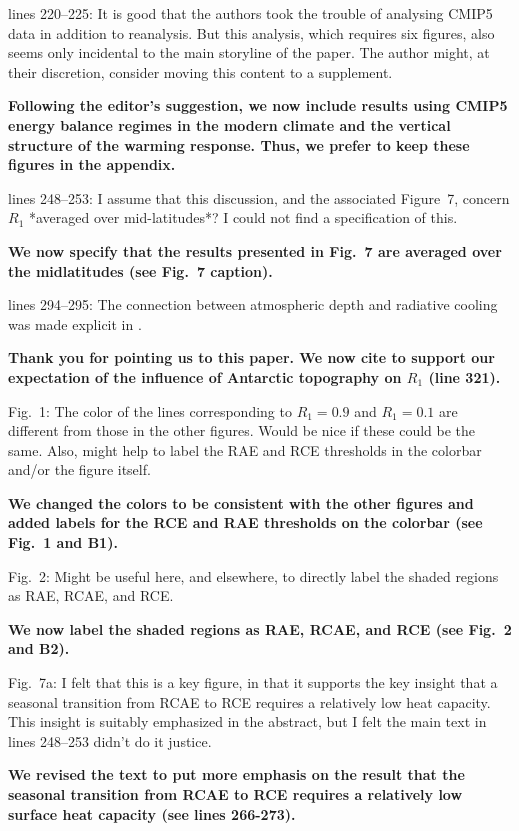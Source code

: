 \documentclass{article}
\begin{document}
lines 220--225: It is good that the authors took the trouble of analysing CMIP5 data in addition to reanalysis. But this analysis, which requires six figures, also seems only incidental to the main storyline of the paper. The author might, at their discretion, consider moving this content to a supplement.

\textbf{Following the editor's suggestion, we now include results using CMIP5 energy balance regimes in the modern climate and the vertical structure of the warming response. Thus, we prefer to keep these figures in the appendix.}

lines 248--253: I assume that this discussion, and the associated Figure~7, concern $R_1$ *averaged over mid-latitudes*? I could not find a specification of this.

\textbf{We now specify that the results presented in Fig.~7 are averaged over the midlatitudes (see Fig.~7 caption).}

lines 294--295: The connection between atmospheric depth and radiative cooling was made explicit in \cite{jeevanjee2018}.

\textbf{Thank you for pointing us to this paper. We now cite \cite{jeevanjee2018} to support our expectation of the influence of Antarctic topography on $R_1$ (line 321).}

Fig.~1: The color of the lines corresponding to $R_1=0.9$ and $R_1=0.1$ are different from those in the other figures. Would be nice if these could be the same. Also, might help to label the RAE and RCE thresholds in the colorbar and/or the figure itself.

\textbf{We changed the colors to be consistent with the other figures and added labels for the RCE and RAE thresholds on the colorbar (see Fig.~1 and B1).}

Fig.~2: Might be useful here, and elsewhere, to directly label the shaded regions as RAE, RCAE, and RCE.

\textbf{We now label the shaded regions as RAE, RCAE, and RCE (see Fig.~2 and B2).}

Fig.~7a: I felt that this is a key figure, in that it supports the key insight that a seasonal transition from RCAE to RCE requires a relatively low heat capacity. This insight is suitably emphasized in the abstract, but I felt the main text in lines 248--253 didn't do it justice.

\textbf{We revised the text to put more emphasis on the result that the seasonal transition from RCAE to RCE requires a relatively low surface heat capacity (see lines 266-273).}




\end{document}
